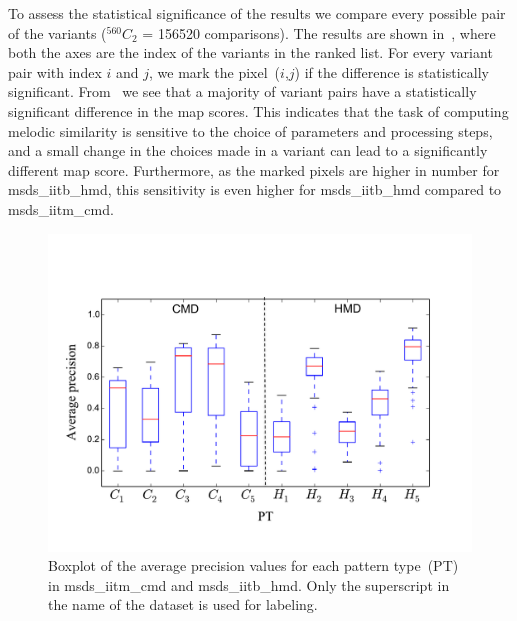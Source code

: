 To assess the statistical significance of the results we compare every possible pair of the variants ($^{560}C_{2}$ = 156520 comparisons). The results are shown in~, where both the axes are the index of the variants in the ranked list. For every variant pair with index $i$ and $j$, we mark the pixel~($i$,$j$) if the difference is statistically significant. From~ we see that a majority of variant pairs have a statistically significant difference in the \gls{map} scores. This indicates that the task of computing melodic similarity is sensitive to the choice of parameters and processing steps, and a small change in the choices made in a variant can lead to a significantly different \gls{map} score. Furthermore, as the marked pixels are higher in number for \acrshort{msds_iitb_hmd}, this sensitivity is even higher for \acrshort{msds_iitb_hmd} compared to \acrshort{msds_iitm_cmd}.


\begin{figure}
	\begin{center}
		\includegraphics[width=\figSizeEightyFive]{ch06_patterns/figures/SimilarityEvaluation/CMD_HMD_CW_MAP.pdf}
	\end{center}
	\caption[Boxplot of average precision values for different types of melodic patterns]{Boxplot of the average precision values for each pattern type~(PT) in \acrshort{msds_iitm_cmd} and \acrshort{msds_iitb_hmd}. Only the superscript in the name of the dataset is used for labeling.}
	\label{fig:patterns_similarity_evaluation_results_boxplot}
\end{figure}


